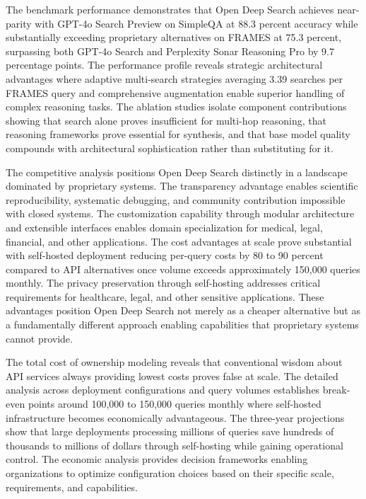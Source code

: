 The benchmark performance demonstrates that Open Deep Search achieves near-parity with GPT-4o Search Preview on SimpleQA at 88.3 percent accuracy while substantially exceeding proprietary alternatives on FRAMES at 75.3 percent, surpassing both GPT-4o Search and Perplexity Sonar Reasoning Pro by 9.7 percentage points. The performance profile reveals strategic architectural advantages where adaptive multi-search strategies averaging 3.39 searches per FRAMES query and comprehensive augmentation enable superior handling of complex reasoning tasks. The ablation studies isolate component contributions showing that search alone proves insufficient for multi-hop reasoning, that reasoning frameworks prove essential for synthesis, and that base model quality compounds with architectural sophistication rather than substituting for it.

The competitive analysis positions Open Deep Search distinctly in a landscape dominated by proprietary systems. The transparency advantage enables scientific reproducibility, systematic debugging, and community contribution impossible with closed systems. The customization capability through modular architecture and extensible interfaces enables domain specialization for medical, legal, financial, and other applications. The cost advantages at scale prove substantial with self-hosted deployment reducing per-query costs by 80 to 90 percent compared to API alternatives once volume exceeds approximately 150,000 queries monthly. The privacy preservation through self-hosting addresses critical requirements for healthcare, legal, and other sensitive applications. These advantages position Open Deep Search not merely as a cheaper alternative but as a fundamentally different approach enabling capabilities that proprietary systems cannot provide.

The total cost of ownership modeling reveals that conventional wisdom about API services always providing lowest costs proves false at scale. The detailed analysis across deployment configurations and query volumes establishes break-even points around 100,000 to 150,000 queries monthly where self-hosted infrastructure becomes economically advantageous. The three-year projections show that large deployments processing millions of queries save hundreds of thousands to millions of dollars through self-hosting while gaining operational control. The economic analysis provides decision frameworks enabling organizations to optimize configuration choices based on their specific scale, requirements, and capabilities.

